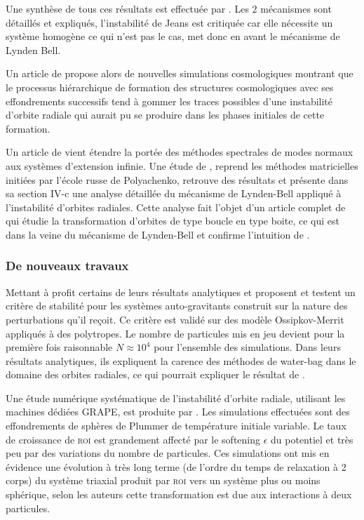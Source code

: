 Une synthèse de tous ces résultats est effectuée par \cite{merritt1987}. Les 2 mécanismes sont détaillés et expliqués, l'instabilité de Jeans est
critiquée car elle nécessite un système homogène ce qui n'est pas le cas, \cite{merritt1987} met donc en avant le mécanisme de Lynden Bell.

Un article de \cite{katz} propose alors de nouvelles simulations cosmologiques montrant que le processus hiérarchique de
formation des structures cosmologiques avec ses effondrements successifs tend à gommer les traces possibles d'une instabilité d'orbite radiale qui
aurait pu se produire dans les phases initiales de cette formation.

Un article de \cite{saha} vient étendre la portée des méthodes spectrales de modes normaux aux systèmes d'extension
infinie. %
Une étude de \cite{weinberg}, reprend les méthodes matricielles initiées par l'école russe de Polyachenko, retrouve des résultats et présente dans sa
section IV-c une analyse détaillée du mécanisme de Lynden-Bell appliqué à l'instabilité d'orbites radiales. Cette analyse fait l'objet d'un
article complet de \cite{cincotta} qui étudie la transformation d'orbites de type boucle en type boite, ce qui est dans la veine du mécanisme de
Lynden-Bell et confirme l'intuition de \cite{merritt1987}.

\subsubsection{De nouveaux travaux}


Mettant à profit certains de leurs résultats analytiques \cite{JPerez96} et \cite{perez_et_al} proposent et testent un critère de stabilité
pour les systèmes auto-gravitants construit sur la nature des perturbations qu'il reçoit. Ce critère est validé sur des modèle Ossipkov-Merrit
appliqués à des polytropes. Le nombre de particules mis en jeu devient pour la première fois raisonnable $N\approx10^{4}$ pour l'ensemble des
simulations. Dans leurs résultats analytiques, ils expliquent la carence des méthodes de water-bag dans le domaine des orbites radiales, ce qui
pourrait expliquer le résultat de \cite{waterbag}.

Une étude numérique systématique de l'instabilité d'orbite radiale, utilisant les machines dédiées \og{}GRAPE\fg, est produite par \cite{theis}. Les
simulations effectuées sont des effondrements de sphères de Plummer de température initiale variable. Le taux de croissance de \textsc{roi} est
grandement affecté par le softening $\epsilon$ du potentiel et très peu par des variations du nombre de particules. Ces simulations ont mis en
évidence une évolution à très long terme (de l'ordre du temps de relaxation à 2 corps) du système triaxial produit par \textsc{roi} vers un système
plus ou moins sphérique, selon les auteurs cette transformation est due aux interactions à deux particules.

